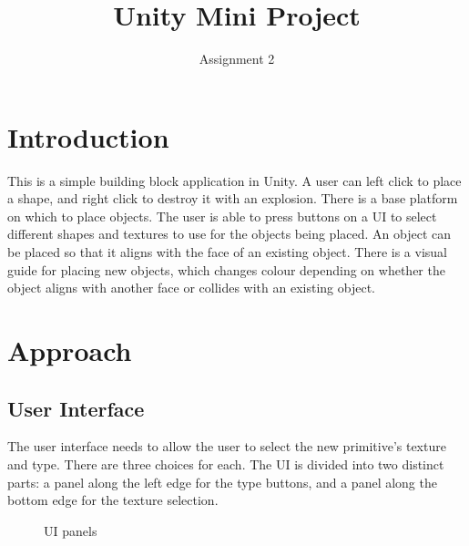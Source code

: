 \documentclass[a4paper, 12pt]{scrartcl}
\title{Unity Mini Project}
\subtitle{Assignment 2}
\date{}
\author{}
\begin{document}
\maketitle

\section{Introduction}
This is a simple building block application in Unity. A user can left click to place a shape, and right click to destroy it with an explosion. There is a base platform on which to place objects. The user is able to press buttons on a UI to select different shapes and textures to use for the objects being placed. An object can be placed so that it aligns with the face of an existing object. There is a visual guide for placing new objects, which changes colour depending on whether the object aligns with another face or collides with an existing object.

\section{Approach}
\subsection{User Interface}
The user interface needs to allow the user to select the new primitive's texture and type. There are three choices for each. The UI is divided into two distinct parts: a panel along the left edge for the type buttons, and a panel along the bottom edge for the texture selection.

\begin{figure}[htp]
  \centering
  \qquad
  \caption{UI panels}
\end{figure}
\end{document}
